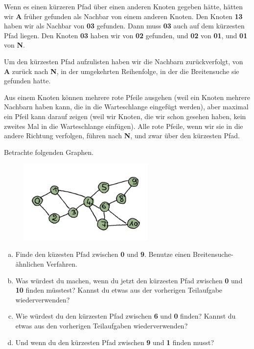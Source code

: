 Wenn es einen kürzeren Pfad über einen anderen Knoten gegeben hätte, hätten wir \textbf{A} früher gefunden als Nachbar von einem anderen Knoten. Den Knoten \textbf{13} haben wir als Nachbar von \textbf{03} gefunden. Dann muss \textbf{03} auch auf dem kürzesten Pfad liegen. Den Knoten \textbf{03} haben wir von \textbf{02} gefunden, und \textbf{02} von \textbf{01}, und \textbf{01} von \textbf{N}.

Um den kürzesten Pfad aufzulisten haben wir die Nachbarn zurückverfolgt, von \textbf{A} zurück nach \textbf{N}, in der umgekehrten Reihenfolge, in der die Breitensuche sie gefunden hatte.

Aus einem Knoten können mehrere rote Pfeile ausgehen (weil ein Knoten mehrere Nachbarn haben kann, die in die Warteschlange eingefügt werden), aber maximal ein Pfeil kann darauf zeigen (weil wir Knoten, die wir schon gesehen haben, kein zweites Mal in die Warteschlange einfügen). Alle rote Pfeile, wenn wir sie in die andere Richtung verfolgen, führen nach \textbf{N}, und zwar über den kürzesten Pfad.

\begin{aufgabe}\label{aufgabe_find_shortest_path}
Betrachte folgenden Graphen. 
\begin{figure}[H]
    \centering
    \includegraphics[width=0.6\textwidth]{Pictures/SP/shortest_path_graph.png}
\end{figure}
\begin{enumerate}[(a)]
    \item Finde den küzesten Pfad zwischen \textbf{0} und \textbf{9}. Benutze einen Breitensuche-ähnlichen Verfahren.
    \item Was würdest du machen, wenn du jetzt den kürzesten Pfad zwischen \textbf{0} und \textbf{10} finden müsstest? Kannst du etwas aus der vorherigen Teilaufgabe wiederverwenden?
    \item Wie würdest du den kürzesten Pfad zwischen \textbf{6} und \textbf{0} finden? Kannst du etwas aus den vorherigen Teilaufgaben wiederverwenden?
    \item Und wenn du den kürzesten Pfad zwischen \textbf{9} und \textbf{1} finden musst?
\end{enumerate}{}
\end{aufgabe}

